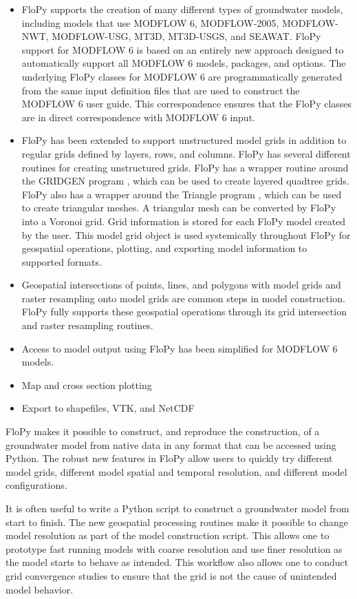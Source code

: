 \documentclass[11pt, oneside]{article}   	%
\begin{document}
\begin{itemize}
\item FloPy supports the creation of many different types of groundwater models, including models that use MODFLOW 6, MODFLOW-2005, MODFLOW-NWT, MODFLOW-USG, MT3D, MT3D-USGS, and SEAWAT.  FloPy support for MODFLOW 6 is based on an entirely new approach designed to automatically support all MODFLOW 6 models, packages, and options.  The underlying FloPy classes for MODFLOW 6 are programmatically generated from the same input definition files that are used to construct the MODFLOW 6 user guide.  This correspondence ensures that the FloPy classes are in direct correspondence with MODFLOW 6 input.
\item FloPy has been extended to support unstructured model grids in addition to regular grids defined by layers, rows, and columns.  FloPy has several different routines for creating unstructured grids.  FloPy has a wrapper routine around the GRIDGEN program \citep{gridgen}, which can be used to create layered quadtree grids.  FloPy also has a wrapper around the Triangle program \citep{trianglemesh}, which can be used to create triangular meshes.  A triangular mesh can be converted by FloPy into a Voronoi grid.  Grid information is stored for each FloPy model created by the user.  This model grid object is used systemically throughout FloPy for geospatial operations, plotting, and exporting model information to supported formats.
\item Geospatial intersections of points, lines, and polygons with model grids and raster resampling onto model grids are common steps in model construction.  FloPy fully supports these geospatial operations through its grid intersection and raster resampling routines.
\item Access to model output using FloPy has been simplified for MODFLOW 6 models.  
\item Map and cross section plotting
\item Export to shapefiles, VTK, and NetCDF
\end{itemize}

FloPy makes it possible to construct, and reproduce the construction, of a groundwater model from native data in any format that can be accessed using Python.  The robust new features in FloPy allow users to quickly try different model grids, different model spatial and temporal resolution, and different model configurations.  

It is often useful to write a Python script to construct a groundwater model from start to finish.  The new geospatial processing routines make it possible to change model resolution as part of the model construction script.  This allows one to prototype fast running models with coarse resolution and use finer resolution as the model starts to behave as intended.  This workflow also allows one to conduct grid convergence studies to ensure that the grid is not the cause of unintended model behavior.
\end{document}
